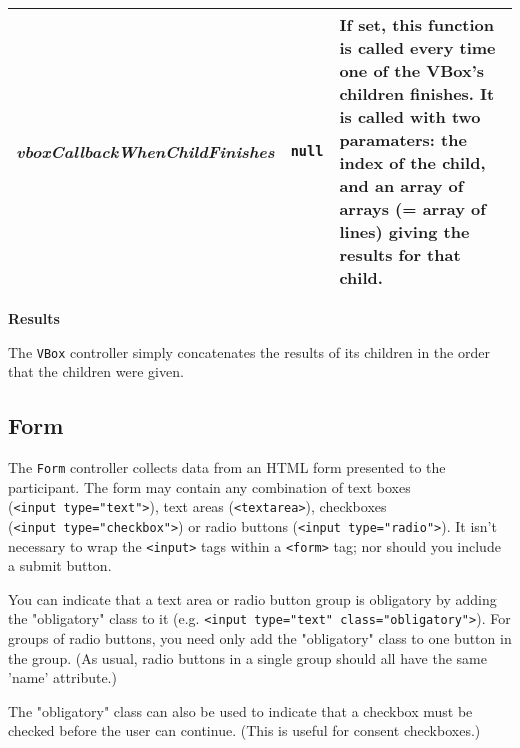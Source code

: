 \documentclass[
]{article}
\begin{document}
\begin{RaggedRight}
\begin{longtable}[]{p{1.7in}p{1in}p{3.15in}}
\begin{minipage}[t]{0.26\columnwidth}\raggedright
\emph{vboxCallbackWhenChildFinishes}\strut
\end{minipage} & \begin{minipage}[t]{0.32\columnwidth}\raggedright
\texttt{null}\strut
\end{minipage} & \begin{minipage}[t]{0.34\columnwidth}\raggedright
If set, this function is called every time one of the VBox's children
finishes. It is called with two paramaters: the index of the child, and
an array of arrays (= array of lines) giving the results for that
child.\strut
\end{minipage}\tabularnewline
\bottomrule
\end{longtable}\normalsize\end{RaggedRight}

\textbf{Results}

The \texttt{VBox} controller simply concatenates the results of its
children in the order that the children were given.

\hypertarget{form}{%
\subsection{Form}\label{form}}

The \texttt{Form} controller collects data from an HTML form presented
to the participant. The form may contain any combination of text boxes
(\texttt{\textless{}input\ type="text"\textgreater{}}), text areas
(\texttt{\textless{}textarea\textgreater{}}), checkboxes
(\texttt{\textless{}input\ type="checkbox"\textgreater{}}) or radio
buttons (\texttt{\textless{}input\ type="radio"\textgreater{}}). It
isn't necessary to wrap the \texttt{\textless{}input\textgreater{}} tags
within a \texttt{\textless{}form\textgreater{}} tag; nor should you
include a submit button.

You can indicate that a text area or radio button group is obligatory by
adding the "obligatory" class to it (e.g.
\texttt{\textless{}input\ type="text"\ class="obligatory"\textgreater{}}).
For groups of radio buttons, you need only add the "obligatory" class to
one button in the group. (As usual, radio buttons in a single group
should all have the same 'name' attribute.)

The "obligatory" class can also be used to indicate that a checkbox must
be checked before the user can continue. (This is useful for consent
checkboxes.)
\end{document}

